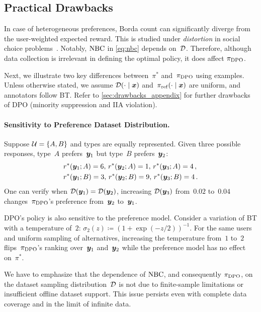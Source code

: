 

\subsection{Practical Drawbacks}
\label{sec:drawbacks}
In case of heterogeneous preferences, Borda count can significantly diverge from the user-weighted expected reward. This is studied under \emph{distortion} in social choice problems~\citep{anshelevich2021distortion}. Notably, ${\rm NBC}$ in \cref{eq:nbc} depends on~${\mathcal{D}}$. Therefore, although data collection is irrelevant in defining the optimal policy, it does affect $\pi_{\rm DPO}$.

Next, we illustrate two key differences between~$\pi^*$ and~$\pi_{\rm DPO}$ using examples. Unless otherwise stated, we assume ${\mathcal{D}}(\cdot \mid {\bm{x}})$ and~$\pi_{\rm ref}(\cdot \mid {\bm{x}})$ are uniform, and annotators follow BT.
Refer to \cref{sec:drawbacks_appendix} for further drawbacks of DPO (minority suppression and IIA violation).

\paragraph{Sensitivity to Preference Dataset Distribution.}
Suppose ${\mathcal{U}} = \{A, B\}$ and types are equally represented. Given three possible responses, type~$A$ prefers~${\bm{y}}_1$ but type~$B$ prefers~${\bm{y}}_2$:
%
\begin{align*}
    &r^*({\bm{y}}_1; A) = 6,\, r^*({\bm{y}}_2; A) = 1,\, r^*({\bm{y}}_3; A) = 4 \,, \\
    &r^*({\bm{y}}_1; B) = 3,\, r^*({\bm{y}}_2; B) = 9,\, r^*({\bm{y}}_3; B) = 4 \,.
\end{align*}
%
One can verify when ${\mathcal{D}}({\bm{y}}_1) = {\mathcal{D}}({\bm{y}}_2)$, increasing ${\mathcal{D}}({\bm{y}}_3)$ from~$0.02$ to~$0.04$ changes~$\pi_{\rm DPO}$'s preference from~${\bm{y}}_2$ to~${\bm{y}}_1$.

DPO's policy is also sensitive to the preference model. Consider a variation of BT with a temperature of~$2$: $\sigma_2(z) \coloneqq (1 + \exp(-z/2))^{-1}$. For the same users and uniform sampling of alternatives, increasing the temperature from~$1$ to~$2$ flips~$\pi_{\rm DPO}$'s ranking over~${\bm{y}}_1$ and~${\bm{y}}_2$ while the preference model has no effect on~$\pi^*$.

We have to emphasize that the dependence of ${\rm NBC}$, and consequently $\pi_{\rm DPO}$, on the dataset sampling distribution~${\mathcal{D}}$ is not due to finite-sample limitations or insufficient offline dataset support. This issue persists even with complete data coverage and in the limit of infinite data.

